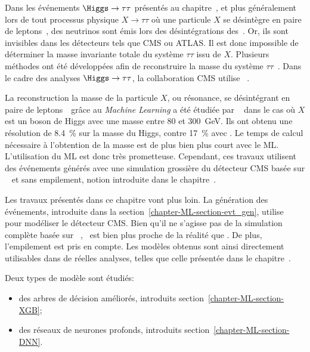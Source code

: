 \par
Dans les événements $\Higgs\to\tau\tau$ présentés au chapitre~,
et plus généralement lors de tout processus physique $X\to\tau\tau$ où une particule $X$ se désintègre en paire de leptons~\tau,
des neutrinos sont émis lors des désintégrations des~\tau.
Or, ils sont invisibles dans les détecteurs tels que CMS ou ATLAS.
Il est donc impossible de déterminer la masse invariante totale du système $\tau\tau$ issu de $X$.
Plusieurs méthodes ont été développées afin de reconstruire la masse du système $\tau\tau$~\cite{ELAGIN2011481,Barr_2011,Gripaios_2013}.
Dans le cadre des analyses $\Higgs\to\tau\tau$, la collaboration CMS utilise \SVFIT~\cite{SVFit_Bianchini_2014}.
\par
La reconstruction la masse de la particule $X$, ou résonance, se désintégrant en paire de leptons~\tau\ grâce au \emph{Machine Learning}
a été étudiée par \citeauthor{BARTSCHI201929}~\cite{BARTSCHI201929} dans le cas où $X$ est un boson de Higgs avec une masse entre \num{80} et \SI{300}{\GeV}.
Ils ont obtenu une résolution de \SI{8.4}{\%} sur la masse du Higgs, contre \SI{17}{\%} avec \SVFIT.
Le temps de calcul nécessaire à l'obtention de la masse est de plus bien plus court avec le ML.
L'utilisation du ML est donc très prometteuse.
Cependant,
ces travaux utilisent des événements générés
avec une simulation grossière du détecteur CMS basée sur
\DELPHES~\cite{Delphes,Delphes_additions}
et sans empilement, notion introduite dans le chapitre~.
\par
Les travaux présentés dans ce chapitre vont plus loin.
La génération des événements, introduite dans la section~\ref{chapter-ML-section-evt_gen},
utilise \FASTSIM~\cite{FastSim_2011,FastSim_2014,FastSim_2017_1,FastSim_2017_2}
pour modéliser le détecteur CMS.
Bien qu'il ne s'agisse pas de la simulation complète basée sur \GEANTfour~\cite{geant4_2003,geant4_2006,geant4_2016},
\FASTSIM\ est bien plus proche de la réalité que \DELPHES.
De plus, l'empilement est pris en compte.
Les modèles obtenus sont ainsi directement utilisables dans de réelles analyses, telles que celle présentée dans le chapitre~.
\par
Deux types de modèle sont étudiés:
\begin{itemize}
\item des arbres de décision améliorés, introduits section~\ref{chapter-ML-section-XGB};
\item des réseaux de neurones profonds, introduits section~\ref{chapter-ML-section-DNN}.
\end{itemize}
